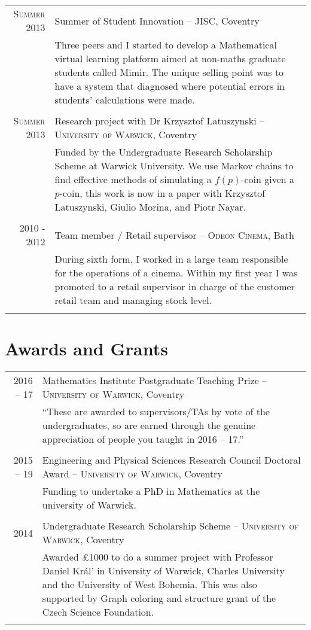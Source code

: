 \documentclass[a4paper,10pt]{article}
\begin{document}
\begin{tabular}{r|p{14 cm}}
\textsc{Summer 2013} & Summer of Student Innovation -- \textsc{JISC}, Coventry\\&\footnotesize{Three peers and I started to develop a Mathematical virtual learning platform aimed at non-maths graduate students called Mimir. The unique selling point was to have a system that diagnosed where potential errors in students' calculations were made.}\\\multicolumn{2}{c}{} \\
\textsc{Summer 2013} & Research project with Dr Krzysztof Latuszynski -- \textsc{University of Warwick}, Coventry\\&\footnotesize{Funded by the Undergraduate Research Scholarship Scheme at Warwick University. We use Markov chains to find effective methods of simulating a $f(p)$-coin given a $p$-coin, this work is now in a paper with Krzysztof Latuszynski, Giulio Morina, and Piotr Nayar.}\\\multicolumn{2}{c}{} \\
\textsc{2010 - 2012} & Team member / Retail supervisor -- \textsc{Odeon Cinema}, Bath\\&\footnotesize{During sixth form, I worked in a large team responsible for the operations of a cinema. Within my first year I was promoted to a retail supervisor in charge of the customer retail team and managing stock level.}\\\multicolumn{2}{c}{} \\
\end{tabular}

\section{Awards and Grants}
\begin{tabular}{r|p{16cm}}
\textsc{2016 -- 17}& Mathematics Institute Postgraduate Teaching Prize -- \textsc{University of Warwick}, Coventry\\&\footnotesize{``These are awarded to supervisors/TAs by vote of the undergraduates, so are earned through the genuine appreciation of people you taught in 2016 -- 17.”}\\\multicolumn{2}{c}{} \\
\textsc{2015 -- 19}& Engineering and Physical Sciences Research Council Doctoral Award -- \textsc{University of Warwick}, Coventry\\&\footnotesize{Funding to undertake a PhD in Mathematics at the university of Warwick.}\\\multicolumn{2}{c}{} \\
\textsc{2014}& Undergraduate Research Scholarship Scheme -- \textsc{University of Warwick}, Coventry\\&\footnotesize{Awarded £1000 to do a summer project with Professor Daniel Král' in University of Warwick, Charles University and the University of West Bohemia. This was also supported by Graph coloring and structure grant of the Czech Science Foundation.}\\\multicolumn{2}{c}{} \\
\end{tabular}
\end{document}
